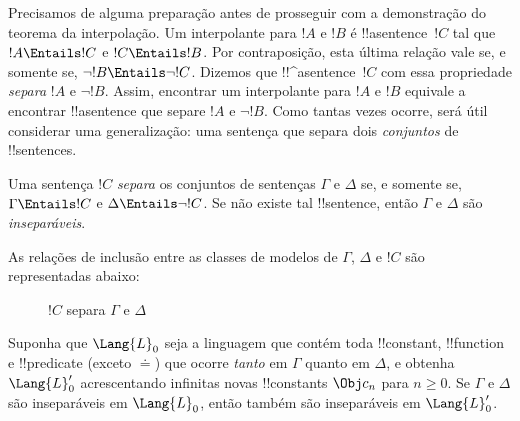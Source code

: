 \documentclass[../../../include/open-logic-section]{subfiles}
\begin{document}


Precisamos de alguma preparação antes de prosseguir com a demonstração
do teorema da interpolação. Um interpolante para $!A$ e $!B$ é
!!a{sentence}~$!C$ tal que $!A \Entails !C$ e $!C \Entails !B$. Por
contraposição, esta última relação vale se, e somente se,
$\lnot !B \Entails \lnot !C$. Dizemos que !!^a{sentence}~$!C$ com essa
propriedade \emph{separa} $!A$ e $\lnot !B$. Assim, encontrar um
interpolante para $!A$ e $!B$ equivale a encontrar !!a{sentence} que
separe $!A$ e $\lnot !B$. Como tantas vezes ocorre, será útil
considerar uma generalização: uma sentença que separa dois
\emph{conjuntos} de !!{sentence}s.

\begin{defn}
Uma sentença $!C$ \emph{separa} os conjuntos de sentenças $\Gamma$ e
$\Delta$ se, e somente se, $\Gamma \Entails !C$ e $\Delta \Entails
\lnot !C$. Se não existe tal !!{sentence}, então $\Gamma$ e $\Delta$
são \emph{inseparáveis}.
\end{defn}

As relações de inclusão entre as classes de modelos de $\Gamma$,
$\Delta$ e $!C$ são representadas abaixo:
\begin{figure}[h]
  \centering
  \caption{$!C$ separa $\Gamma$ e $\Delta$}
\end{figure}


\begin{lem}
Suponha que $\Lang{L}_0$ seja a linguagem que contém toda
!!{constant}, !!{function} e !!{predicate} (exceto $\doteq$) que ocorre
\emph{tanto} em $\Gamma$ quanto em $\Delta$, e obtenha $\Lang{L}'_0$
acrescentando infinitas novas !!{constant}s $\Obj c_n$ para $n \ge 0$.
Se $\Gamma$ e $\Delta$ são inseparáveis em $\Lang{L}_0$, então também
são inseparáveis em $\Lang{L}'_0$.
\end{lem}
\end{document}
